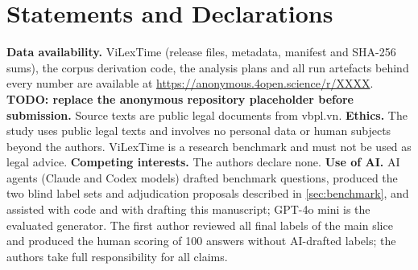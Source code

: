 \documentclass[sigconf,anonymous,review]{acmart}
\begin{document}
\section*{Statements and Declarations}
\footnotesize
\textbf{Data availability.} ViLexTime (release files, metadata, manifest and SHA-256 sums), the corpus derivation code, the analysis plans and all run artefacts behind every number are available at \url{https://anonymous.4open.science/r/XXXX}. \textbf{TODO: replace the anonymous repository placeholder before submission.} Source texts are public legal documents from vbpl.vn. \textbf{Ethics.} The study uses public legal texts and involves no personal data or human subjects beyond the authors. ViLexTime is a research benchmark and must not be used as legal advice. \textbf{Competing interests.} The authors declare none. \textbf{Use of AI.} AI agents (Claude and Codex models) drafted benchmark questions, produced the two blind label sets and adjudication proposals described in \cref{sec:benchmark}, and assisted with code and with drafting this manuscript; GPT-4o mini is the evaluated generator. The first author reviewed all final labels of the main slice and produced the human scoring of 100 answers without AI-drafted labels; the authors take full responsibility for all claims.



\end{document}
